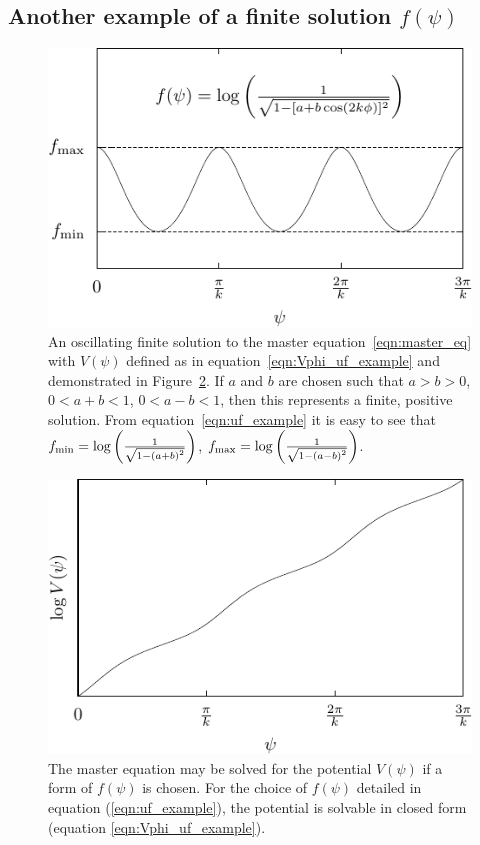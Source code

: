 \subsection{Another example of a finite solution \(f(\psi)\)}
%
\begin{figure}[tp]
  \centering
  \includegraphics[width=\textwidth]{chapters/kinetic_dominance/figures/uf}
  \caption{An oscillating finite solution to the master equation~\protect\eqref{eqn:master_eq} with \(V(\psi)\) defined as in equation~\protect\eqref{eqn:Vphi_uf_example} and demonstrated in Figure~\protect\ref{fig:figure_ospot}. If \(a\) and \(b\) are chosen such that \(a>b>0\), \(0<a+b<1\), \(0<a-b<1\), then this represents a finite, positive solution.  From equation~\protect\eqref{eqn:uf_example} it is easy to see that \(f_\mathrm{min} = \log\left(\frac{1}{\sqrt{1-{(a+b)}^2}}\right)\), \(f_\mathrm{max}=\log\left(\frac{1}{\sqrt{1-{(a-b)}^2}}\right)\).}\label{fig:figure_uf}
\end{figure}

%
\begin{figure}[tp]
  \centering
  \includegraphics[width=\textwidth]{chapters/kinetic_dominance/figures/ospot}
  \caption{The master equation may be solved for the potential \(V(\psi)\) if a form of \(f(\psi)\) is chosen. For the choice of \(f(\psi)\) detailed in equation (\protect\ref{eqn:uf_example}), the potential is solvable in closed form (equation \protect\ref{eqn:Vphi_uf_example}).}\label{fig:figure_ospot}
\end{figure}
%

